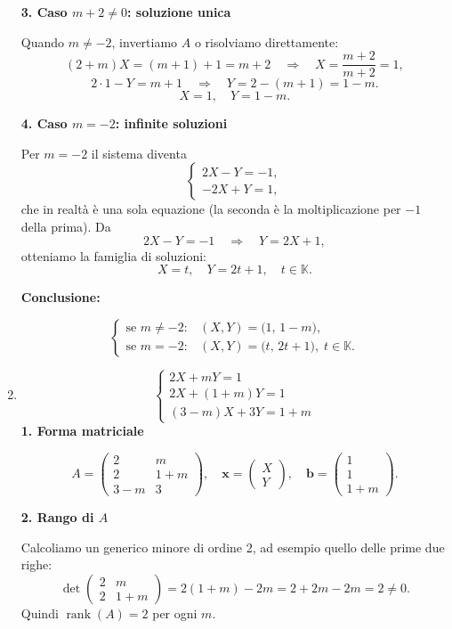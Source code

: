 \documentclass{article}
\theoremstyle{plain}
\theoremstyle{definition}
\theoremstyle{remark}
\begin{document}
\begin{enumerate}
\bigskip
\textbf{3. Caso \(m + 2 \neq 0\): soluzione unica}

Quando \(m\neq -2\), invertiamo \(A\) o risolviamo direttamente:
\[
(2+m)X = (m+1)+1 = m+2
\quad\Longrightarrow\quad
X = \frac{m+2}{m+2} = 1,
\]
\[
2\cdot1 - Y = m+1
\quad\Longrightarrow\quad
Y = 2 - (m+1) = 1 - m.
\]
\[
\boxed{X=1,\quad Y=1-m.}
\]

\bigskip
\textbf{4. Caso \(m = -2\): infinite soluzioni}

Per \(m=-2\) il sistema diventa
\[
\begin{cases}
2X - Y = -1,\\
-2X + Y = 1,
\end{cases}
\]
che in realtà è una sola equazione (la seconda è la moltiplicazione per \(-1\) della prima). Da
\[
2X - Y = -1
\quad\Longrightarrow\quad
Y = 2X + 1,
\]
otteniamo la famiglia di soluzioni:
\[
\boxed{X = t,\quad Y = 2t + 1,\quad t\in\mathbb{K}.}
\]

\bigskip
\textbf{Conclusione:}

\[
\begin{cases}
\text{se }m\neq -2: & (X,Y) = \bigl(1,\,1-m\bigr),\\
\text{se }m=-2:    & (X,Y) = \bigl(t,\,2t+1\bigr),\;t\in\mathbb{K}.
\end{cases}
\]

    \item \[
    \begin{cases}
        2X+mY=1\\
        2X+(1+m)Y=1\\
        (3-m)X+3Y=1+m
    \end{cases}\]
    \bigskip
\textbf{1. Forma matriciale}

\[
A = \begin{pmatrix}
2      & m      \\
2      & 1 + m  \\
3 - m  & 3
\end{pmatrix},
\quad
\mathbf{x} = \begin{pmatrix}X\\Y\end{pmatrix},
\quad
\mathbf{b} = \begin{pmatrix}1\\1\\1+m\end{pmatrix}.
\]

\bigskip
\textbf{2. Rango di \(A\)}

Calcoliamo un generico minore di ordine 2, ad esempio quello delle prime due righe:
\[
\det\begin{pmatrix}
2 & m\\
2 & 1+m
\end{pmatrix}
=2(1+m) - 2m =2 +2m -2m =2 \neq 0.
\]
Quindi \(\operatorname{rank}(A)=2\) per ogni \(m\).


\end{enumerate}
\end{document}
